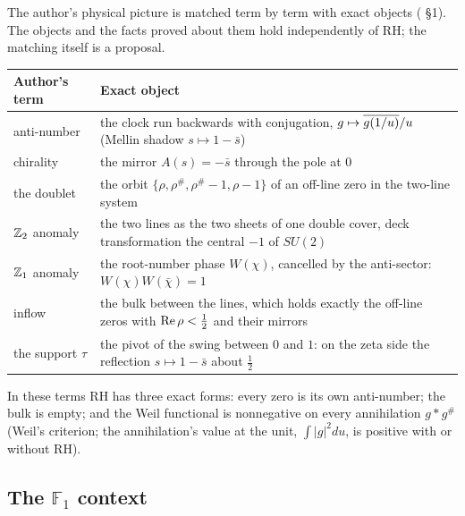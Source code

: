 The author's physical picture is matched term by term with exact objects ( §1). The objects and the facts proved about them hold independently of RH; the matching itself is a proposal.
\begin{center}\small
\begin{tabularx}{\linewidth}{@{}l X@{}}
\toprule
Author's term & Exact object\\
\midrule
anti-number & the clock run backwards with conjugation, $g\mapsto\overline{g(1/u)}/u$ (Mellin shadow $s\mapsto1-\bar s$)\\
chirality & the mirror $A(s)=-\bar s$ through the pole at $0$\\
the doublet & the orbit $\{\rho,\rho^\#,\rho^\#-1,\rho-1\}$ of an off-line zero in the two-line system\\
$\mathbb{Z}_2$ anomaly & the two lines as the two sheets of one double cover, deck transformation the central $-1$ of $SU(2)$\\
$\mathbb{Z}_1$ anomaly & the root-number phase $W(\chi)$, cancelled by the anti-sector: $W(\chi)W(\bar\chi)=1$\\
inflow & the bulk between the lines, which holds exactly the off-line zeros with $\operatorname{Re}\rho<\tfrac12$ and their mirrors\\
the support $\tau$ & the pivot of the swing between $0$ and $1$: on the zeta side the reflection $s\mapsto1-\bar s$ about $\tfrac12$\\
\bottomrule
\end{tabularx}
\end{center}
In these terms RH has three exact forms: every zero is its own anti-number; the bulk is empty; and the Weil functional is nonnegative on every annihilation $g*g^\#$ (Weil's criterion; the annihilation's value at the unit, $\int|g|^2du$, is positive with or without RH).

\subsection{The \texorpdfstring{$\mathbb{F}_1$}{F1} context}


